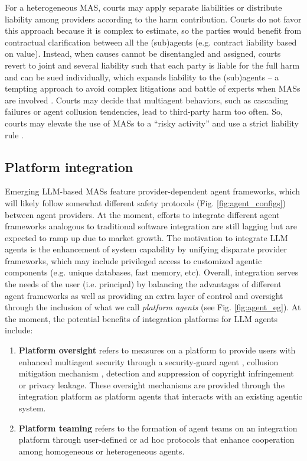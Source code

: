 \documentclass[11pt]{article}
\begin{document}
For a heterogeneous MAS, courts may apply separate liabilities or distribute liability among providers according to the harm contribution.  Courts do not favor this approach because it is complex to estimate, so the parties would benefit from contractual clarification between all the (sub)agents (e.g. contract liability based on value).  Instead, when causes cannot be disentangled and assigned, courts revert to joint and several liability such that each party is liable for the full harm and can be sued individually, which expands liability to the (sub)agents -- a tempting approach to avoid complex litigations and battle of experts when MASs are involved \citep{custers2025liability}. Courts may decide that multiagent behaviors, such as cascading failures or agent collusion tendencies, lead to third-party harm too often. So, courts may elevate the use of MASs to a ``risky activity'' and use a strict liability rule \citep{vcerka2015liability}.

\subsection{Platform integration}

Emerging LLM-based MASs feature provider-dependent agent frameworks, which will likely follow somewhat different safety protocols (Fig. \ref{fig:agent_configs}) between agent providers. At the moment, efforts to integrate different agent frameworks analogous to traditional software integration \citep{bass_software_2021} are still lagging but are expected to ramp up due to market growth. The motivation to integrate LLM agents is the enhancement of system capability by unifying disparate provider frameworks, which may include privileged access to customized agentic components (e.g. unique databases, fast memory, etc). Overall, integration serves the needs of the user (i.e. principal) by balancing the advantages of different agent frameworks as well as providing an extra layer of control and oversight through the inclusion of what we call \textit{platform agents} (see Fig. \ref{fig:agent_eg}). At the moment, the potential benefits of integration platforms for LLM agents include:
\begin{enumerate}[wide, labelindent=0pt, itemsep=-1pt, topsep=1pt]
    \item[\textbullet] \textbf{Platform oversight} refers to measures on a platform to provide users with enhanced multiagent security through a security-guard agent \citep{xiang_guardagent_2024}, collusion mitigation mechanism \citep{foxabbott_defining_2023}, detection and suppression of copyright infringement \citep{liu_copyjudge_2025} or privacy leakage. These oversight mechanisms are provided through the integration platform as platform agents that interacts with an existing agentic system.
    \item[\textbullet] \textbf{Platform teaming} refers to the formation of agent teams on an integration platform through user-defined or ad hoc protocols \citep{mirsky_survey_2022,wang_nagent_2024} that enhance cooperation among homogeneous or heterogeneous agents.
\end{enumerate}
\end{document}
